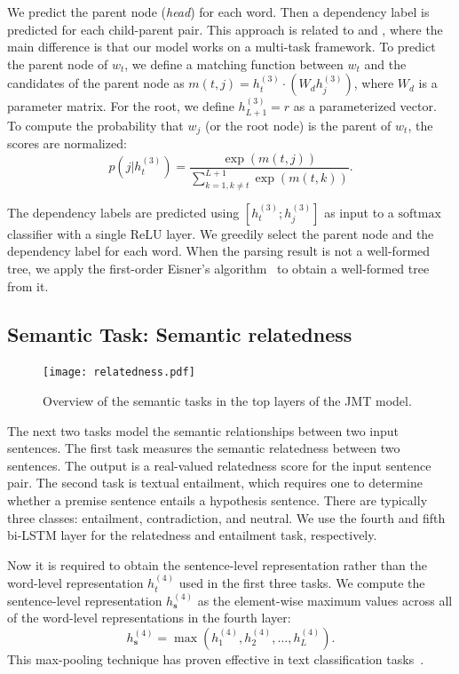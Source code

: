 \documentclass[11pt,a4paper]{article}
\begin{document}
We predict the parent node ({\it head}) for each word.
Then a dependency label is predicted for each child-parent pair.
This approach is related to \citet{biaffine2017} and \citet{zhang2017head}, where the main difference is that our model works on a multi-task framework.
To predict the parent node of $w_t$, we define a matching function between $w_t$ and the candidates of the parent node as $m\left(t, j\right)={h^{(3)}_{t}} \cdot (W_d h^{(3)}_{j})$,
where $W_d$ is a parameter matrix.
For the root, we define $h^{(3)}_{L+1}=r$ as a parameterized vector.
To compute the probability that $w_j$ (or the root node) is the parent of $w_t$, the scores are normalized:
\begin{equation}
p(j|h^{(3)}_{t})=\frac{\exp\left(m\left(t, j\right)\right)}{\sum_{k=1, k\neq t}^{L+1}\exp\left(m\left(t, k\right)\right)}.
\end{equation}

The dependency labels are predicted using $[h^{(3)}_t; h^{(3)}_{j}]$ as input to a $\mathrm{softmax}$ classifier with a single $\mathrm{ReLU}$ layer.
We greedily select the parent node and the dependency label for each word.
When the parsing result is not a well-formed tree, we apply the first-order Eisner's algorithm~\citep{eisner1996} to obtain a well-formed tree from it.


\subsection{Semantic Task: Semantic relatedness}

\begin{figure}[t]
	\begin{center}
    	\texttt{[image: relatedness.pdf]}
    \end{center}
\label{fig6}
\caption{Overview of the semantic tasks in the top layers of the JMT model.}
\end{figure}
\fi

The next two tasks model the semantic relationships between two input sentences. 
The first task measures the semantic relatedness between two sentences.
The output is a real-valued relatedness score for the input sentence pair.
The second task is textual entailment, which requires one to determine whether a premise sentence entails a hypothesis sentence.
There are typically three classes: entailment, contradiction, and neutral.
We use the fourth and fifth bi-LSTM layer for the relatedness  and entailment task, respectively.

Now it is required to obtain the sentence-level representation rather than the word-level representation $h^{(4)}_{t}$ used in the first three tasks.
We compute the sentence-level representation $h^{(4)}_{\mathbf{s}}$ as the element-wise maximum values across all of the word-level representations in the fourth layer:
\begin{equation}
{h}^{(4)}_{\mathbf{s}}=\max\left({h}^{(4)}_{1}, {h}^{(4)}_{2}, \ldots, {h}^{(4)}_{L}\right).
\end{equation}
This max-pooling technique has proven effective in text classification tasks~\citep{lai2015maxpooling}.
\end{document}
